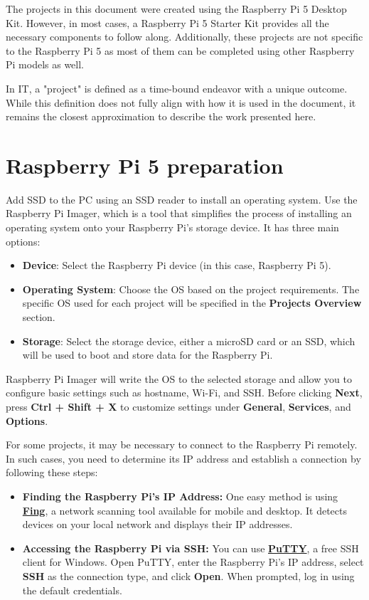 \documentclass[a4paper,12pt]{article}
\begin{document}
The projects in this document were created using the Raspberry Pi 5 Desktop Kit. However, in most cases, a Raspberry Pi 5 Starter Kit provides all the necessary components to follow along. Additionally, these projects are not specific to the Raspberry Pi 5 as most of them can be completed using other Raspberry Pi models as well.  

In IT, a "project" is defined as a time-bound endeavor with a unique outcome. While this definition does not fully align with how it is used in the document, it remains the closest approximation to describe the work presented here.

\section*{Raspberry Pi 5 preparation}

Add SSD to the PC using an SSD reader to install an operating system. Use the Raspberry Pi Imager, which is a tool that simplifies the process of installing an operating system onto your Raspberry Pi’s storage device. It has three main options:
\begin{itemize}
\item \textbf{Device}: Select the Raspberry Pi device (in this case, Raspberry Pi 5).
\item \textbf{Operating System}: Choose the OS based on the project requirements. The specific OS used for each project will be specified in the \textbf{Projects Overview} section.
\item \textbf{Storage}: Select the storage device, either a microSD card or an SSD, which will be used to boot and store data for the Raspberry Pi.
\end{itemize}

Raspberry Pi Imager will write the OS to the selected storage and allow you to configure basic settings such as hostname, Wi-Fi, and SSH. Before clicking \textbf{Next}, press \textbf{Ctrl + Shift + X} to customize settings under \textbf{General}, \textbf{Services}, and \textbf{Options}.

For some projects, it may be necessary to connect to the Raspberry Pi remotely. In such cases, you need to determine its IP address and establish a connection by following these steps:

\begin{itemize}  
\item \textbf{Finding the Raspberry Pi's IP Address:} One easy method is using \href{https://www.fing.com/}{\textbf{\color{blue}Fing}}, a network scanning tool available for mobile and desktop. It detects devices on your local network and displays their IP addresses.  
\item \textbf{Accessing the Raspberry Pi via SSH:} You can use \href{https://www.chiark.greenend.org.uk/~sgtatham/putty/}{\textbf{\color{blue}PuTTY}}, a free SSH client for Windows. Open PuTTY, enter the Raspberry Pi's IP address, select \textbf{SSH} as the connection type, and click \textbf{Open}. When prompted, log in using the default credentials.  
\end{itemize}  
\end{document}

